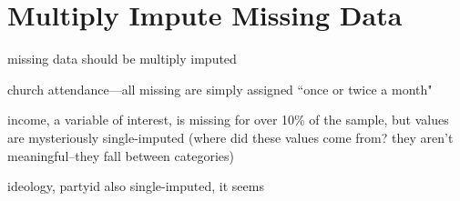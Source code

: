 
\section{Multiply Impute Missing Data}

missing data should be multiply imputed \citep[e.g.,][]{King2001}

church attendance---all missing are simply assigned ``once or twice a month"

income, a variable of interest, is missing for over 10\% of the sample, but values are mysteriously single-imputed (where did these values come from? they aren't meaningful--they fall between categories)

ideology, partyid also single-imputed, it seems
